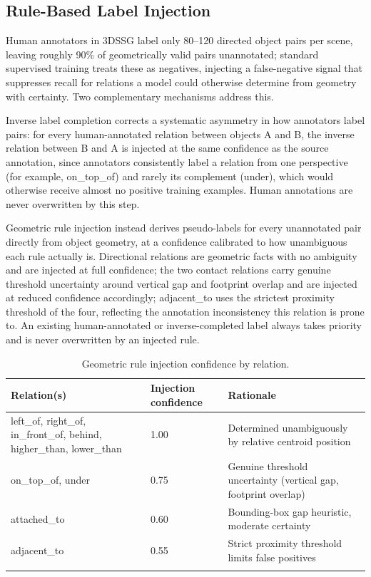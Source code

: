 \documentclass[sn-mathphys,Numbered]{sn-jnl}
\begin{document}
\FloatBarrier
\subsection{Rule-Based Label Injection}\label{subsec4-4}

Human annotators in 3DSSG label only 80--120 directed object pairs per scene, leaving roughly 90\% of geometrically valid pairs unannotated; standard supervised training treats these as negatives, injecting a false-negative signal that suppresses recall for relations a model could otherwise determine from geometry with certainty. Two complementary mechanisms address this.

Inverse label completion corrects a systematic asymmetry in how annotators label pairs: for every human-annotated relation between objects A and B, the inverse relation between B and A is injected at the same confidence as the source annotation, since annotators consistently label a relation from one perspective (for example, on\_top\_of) and rarely its complement (under), which would otherwise receive almost no positive training examples. Human annotations are never overwritten by this step.

Geometric rule injection instead derives pseudo-labels for every unannotated pair directly from object geometry, at a confidence calibrated to how unambiguous each rule actually is. Directional relations are geometric facts with no ambiguity and are injected at full confidence; the two contact relations carry genuine threshold uncertainty around vertical gap and footprint overlap and are injected at reduced confidence accordingly; adjacent\_to uses the strictest proximity threshold of the four, reflecting the annotation inconsistency this relation is prone to. An existing human-annotated or inverse-completed label always takes priority and is never overwritten by an injected rule.

\begin{table}[htbp]
\centering
\caption{Geometric rule injection confidence by relation.}\label{tab3}
\small
\begin{tabular}{@{}p{3.8cm}p{1.6cm}p{4.3cm}@{}}
\toprule
Relation(s) & Injection confidence & Rationale \\
\midrule
left\_of, right\_of, in\_front\_of, behind, higher\_than, lower\_than & 1.00 & Determined unambiguously by relative centroid position \\
\midrule
on\_top\_of, under & 0.75 & Genuine threshold uncertainty (vertical gap, footprint overlap) \\
\midrule
attached\_to & 0.60 & Bounding-box gap heuristic, moderate certainty \\
\midrule
adjacent\_to & 0.55 & Strict proximity threshold limits false positives \\
\botrule
\end{tabular}
\end{table}
\end{document}
